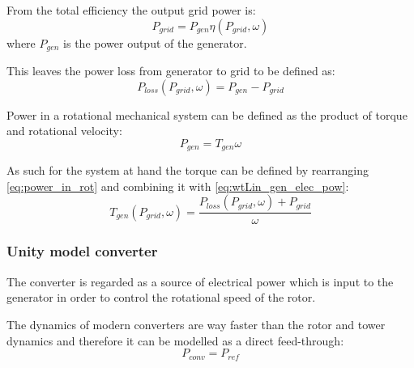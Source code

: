 From the total efficiency the output grid power is:
\begin{equation}\label{eq:wtLin_gen_elec_pow}
	P_{grid} = P_{gen} \eta(P_{grid},\omega)
\end{equation}
where $ P_{gen} $ is the power output of the generator.

This leaves the power loss from generator to grid to be defined as:
\begin{equation}\label{eq_wtLin_gen_pow_loss}
	P_{loss}(P_{grid}, \omega) = P_{gen} - P_{grid}%
\end{equation}


Power in a rotational mechanical system can be defined as the product of torque and rotational velocity:
\begin{equation}\label{eq:power_in_rot}
	P_{gen} = T_{gen} \omega
\end{equation}

As such for the system at hand the torque can be defined by rearranging \cref{eq:power_in_rot} and combining it with \cref{eq:wtLin_gen_elec_pow}:
\begin{equation}\label{key}
	T_{gen}(P_{grid}, \omega) = \dfrac{P_{loss}(P_{grid}, \omega) + P_{grid}}{\omega}
\end{equation}


\subsubsection{Unity model converter}
The converter is regarded as a source of electrical power which is input to the generator in order to control the rotational speed of the rotor.

The dynamics of modern converters are way faster than the rotor and tower dynamics and therefore it can be modelled as a direct feed-through:
\begin{equation}\label{eq:}
	P_{conv} = P_{ref}
\end{equation}



%	

